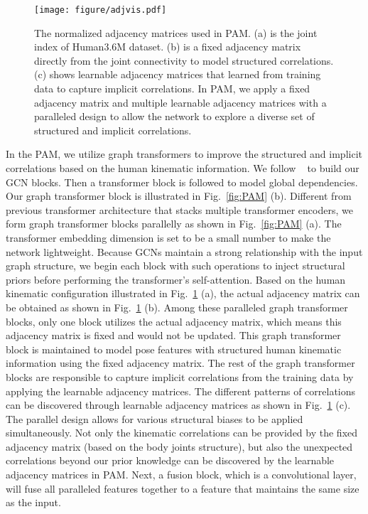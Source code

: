 \documentclass[sigconf]{acmart}
\begin{document}
\begin{figure}[htp]
\centering
  \texttt{[image: figure/adjvis.pdf]}
  \vspace{-10pt}
  \caption{The normalized adjacency matrices used in PAM. (a) is the joint index of Human3.6M dataset. (b) is a fixed adjacency matrix directly from the joint connectivity to model structured correlations. (c) shows learnable adjacency matrices that learned from training data to capture implicit correlations. In PAM, we apply a fixed adjacency matrix and multiple learnable adjacency matrices with a paralleled design to allow the network to explore a diverse set of structured and implicit correlations.} 
  \label{fig:adjvis}
  \vspace{-15pt}
\end{figure}


In the PAM, we utilize graph transformers to improve the structured and implicit correlations based on the human kinematic information. We follow ~\cite{MGCN_2021_ICCV} to build our GCN blocks. 
Then a transformer block is followed to model global dependencies. Our graph transformer block is illustrated in Fig.~\ref{fig:PAM} (b). Different from previous transformer architecture that stacks multiple transformer encoders, we form graph transformer blocks parallelly as shown in Fig.~\ref{fig:PAM} (a). The transformer embedding dimension is set to be a small number to make the network lightweight. 
Because GCNs maintain a strong relationship with the input graph structure, we begin each block with such operations to inject structural priors before performing the transformer's self-attention. 
Based on the human kinematic configuration illustrated in Fig.~\ref{fig:adjvis} (a), the actual adjacency matrix can be obtained as shown in Fig.~\ref{fig:adjvis} (b). Among these paralleled graph transformer blocks, only one block utilizes the actual adjacency matrix, which means this adjacency matrix is fixed and would not be updated. This graph transformer block is maintained to model pose features with structured human kinematic information using the fixed adjacency matrix.
The rest of the graph transformer blocks are responsible to capture implicit correlations from the training data by applying the learnable adjacency matrices. The different patterns of correlations can be discovered through learnable adjacency matrices as shown in Fig.~\ref{fig:adjvis} (c). The parallel design allows for various structural biases to be applied simultaneously. Not only the kinematic correlations can be provided by the fixed adjacency matrix (based on the body joints structure), but also the unexpected correlations beyond our prior knowledge can be discovered by the learnable adjacency matrices in PAM. Next, a fusion block, which is a convolutional layer, will fuse all paralleled features together to a feature that maintains the same size as the input. 
\end{document}
